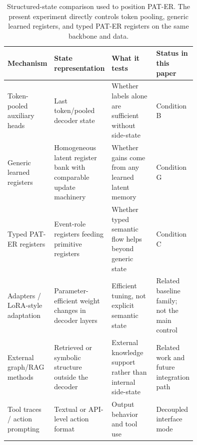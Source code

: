 \begin{table}[H]
\caption{Structured-state comparison used to position PAT-ER. The present experiment directly controls token pooling, generic learned registers, and typed PAT-ER registers on the same backbone and data.\label{tab:structured_mechanisms}}
\footnotesize
\begin{tabularx}{\textwidth}{@{}p{0.22\linewidth}p{0.28\linewidth}p{0.25\linewidth}X@{}}
\toprule
\textbf{Mechanism} & \textbf{State representation} & \textbf{What it tests} & \textbf{Status in this paper} \\
\midrule
Token-pooled auxiliary heads & Last token/pooled decoder state & Whether labels alone are sufficient without side-state & Condition B \\
Generic learned registers & Homogeneous latent register bank with comparable update machinery & Whether gains come from any learned latent memory & Condition G \\
Typed PAT-ER registers & Event-role registers feeding primitive registers & Whether typed semantic flow helps beyond generic state & Condition C \\
Adapters / LoRA-style adaptation & Parameter-efficient weight changes in decoder layers & Efficient tuning, not explicit semantic state & Related baseline family; not the main control \\
External graph/RAG methods & Retrieved or symbolic structure outside the decoder & External knowledge support rather than internal side-state & Related work and future integration path \\
Tool traces / action prompting & Textual or API-level action format & Output behavior and tool use & Decoupled interface mode \\
\bottomrule
\end{tabularx}
\end{table}

